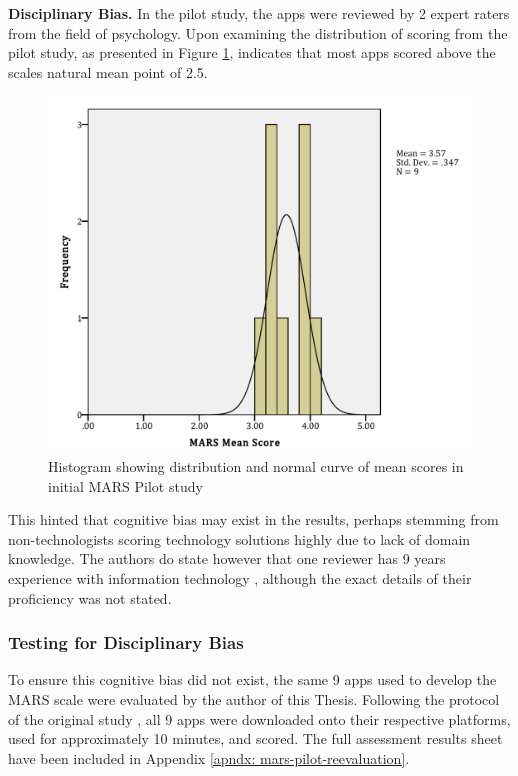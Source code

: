 \textbf{Disciplinary Bias.}
In the pilot study, the apps were reviewed by 2 expert raters from the field of psychology. Upon examining the distribution of scoring from the pilot study, as presented in Figure \ref{fig: mars-pilot-histogram}, indicates that most apps scored above the scales natural mean point of 2.5. \begin{figure}[t]
    \centering
    \includegraphics[scale=0.20, angle=0]{Files/prevention-study-2/figures/mars-pilot-histogram}
    \caption{Histogram showing distribution and normal curve of mean scores in initial MARS Pilot study}
    \label{fig: mars-pilot-histogram}
\end{figure}
This hinted that cognitive bias may exist in the results, perhaps stemming from non-technologists scoring technology solutions highly due to lack of domain knowledge. The authors do state however that one reviewer has 9 years experience with information technology \cite{Stoyanov2015}, although the exact details of their proficiency was not stated.

\subsubsection{Testing for Disciplinary Bias}
To ensure this cognitive bias did not exist, the same 9 apps used to develop the MARS scale were evaluated by the author of this Thesis. Following the protocol of the original study \cite{Stoyanov2015}, all 9 apps were downloaded onto their respective platforms, used for approximately 10 minutes, and scored. The full assessment results sheet have been included in Appendix \ref{apndx: mars-pilot-reevaluation}.

